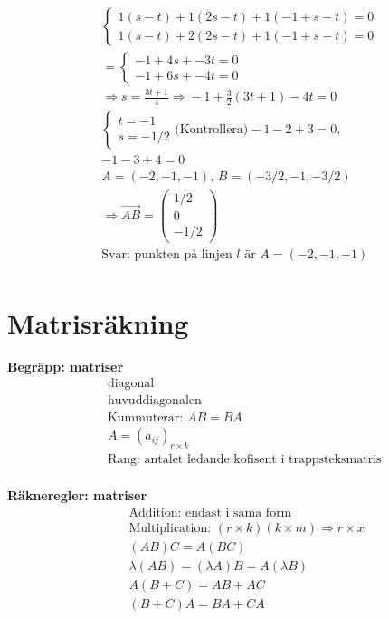 \begin{multicols}{2}
\begin{align*}
  &\left\{\begin{array}{r}
  1(s-t) + 1(2s-t) + 1(-1+s-t) = 0  \\
  1(s-t) + 2(2s-t) + 1(-1+s-t) = 0  
  \end{array}\right. \\
  &=\left\{\begin{array}{r}
  -1 + 4s + -3t = 0  \\
  -1 + 6s + -4t = 0 
  \end{array}\right. \\
  &\Rightarrow{} s=\frac{3t+1}{4} \Rightarrow{} -1 + \frac{3}{2} (3t+1) -4t = 0 \\
  &\left\{\begin{array}{r}
  t=-1  \\
  s=-1/2
  \end{array}\right. \text{(Kontrollera)} -1 -2 +3 = 0, \\
  &-1 -3 +4 = 0 \\
  &A= (-2,-1,-1), \, B= (-3/2,-1,-3/2)  \\
  &\Rightarrow\overrightarrow{AB}=
  \begin{pmatrix} 1/2 \\ 0 \\ -1/2 \end{pmatrix} \\
  &\text{Svar: punkten på linjen $l$ är } A= (-2,-1,-1) \\
\end{align*}


\section{Matrisräkning}
\textbf{Begräpp: matriser}
\begin{align*} 
  &\quad  \text{diagonal} \\
  &\quad  \text{huvuddiagonalen} \\
  &\quad  \text{Kummuterar: } AB=BA \\
  &\quad  A={(a_{ij})}_{r\times{k}} \\
  &\quad  \text{Rang: antalet ledande kofisent i trappsteksmatris } \\ 
\end{align*}

\textbf{Räkneregler: matriser}
\begin{align*}
  &\quad  \text{Addition: endast i sama form} \\
  &\quad  \text{Multiplication: } (r\times{k})(k\times{m}) \Rightarrow r\times{x}  \\
  &\quad  (AB)C=A(BC) \\
  &\quad  \lambda(AB) = (\lambda{A})B = A(\lambda{B}) \\
  &\quad  A(B+C) = AB + AC \\
  &\quad  (B+C)A = BA+CA \\
\end{align*}


\end{multicols}

